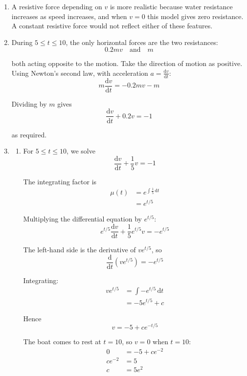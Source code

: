 \documentclass[leqno]{article}
\begin{document}
\begin{enumerate}[
  label=\textbf{\arabic*.},
  leftmargin=*,
  topsep=0pt,
  partopsep=0pt,
  parsep=0pt
]
\vspace*{10pt}

\begin{djsSolution}
\begin{enumerate}[label=\textbf{(\alph*)}]
  \item A resistive force depending on $v$ is more realistic because water resistance increases as speed increases, and when $v=0$ this model gives zero resistance. A constant resistive force would not reflect either of these features.

  \item During $5 \le t \le 10$, the only horizontal forces are the two resistances:
  \[
  0.2mv \quad \text{and} \quad m
  \]

  both acting opposite to the motion. Take the direction of motion as positive. Using Newton's second law, with acceleration $a=\frac{\mathrm{d}v}{\mathrm{d}t}$:
  \[
  m\frac{\mathrm{d}v}{\mathrm{d}t}=-0.2mv-m
  \]

  Dividing by $m$ gives
  \[
  \frac{\mathrm{d}v}{\mathrm{d}t}+0.2v=-1
  \]

  as required.

  \item \begin{enumerate}[label=(\roman*)]
    \item For $5 \le t \le 10$, we solve
    \[
    \frac{\mathrm{d}v}{\mathrm{d}t}+\frac15v=-1
    \]

    The integrating factor is
    \begin{align*}
    \mu(t)&=e^{\int \frac15\,\mathrm{d}t}\\
    &=e^{t/5}
    \end{align*}

    Multiplying the differential equation by $e^{t/5}$:
    \[
    e^{t/5}\frac{\mathrm{d}v}{\mathrm{d}t}+\frac15e^{t/5}v=-e^{t/5}
    \]

    The left-hand side is the derivative of $ve^{t/5}$, so
    \[
    \frac{\mathrm{d}}{\mathrm{d}t}\left(ve^{t/5}\right)=-e^{t/5}
    \]

    Integrating:
    \begin{align*}
    ve^{t/5}&=\int -e^{t/5}\,\mathrm{d}t \\
    &=-5e^{t/5}+c
    \end{align*}

    Hence
    \[
    v=-5+ce^{-t/5}
    \]

    The boat comes to rest at $t=10$, so $v=0$ when $t=10$:
    \begin{align*}
    0&=-5+ce^{-2} \\
    ce^{-2}&=5 \\
    c&=5e^2
    \end{align*}


\end{enumerate}
\end{enumerate}
\end{djsSolution}
\end{enumerate}
\end{document}
